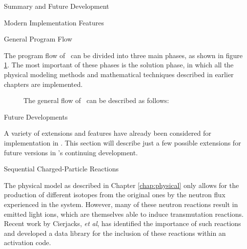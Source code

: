 \begin{chapter}{Summary and Future Development}
\begin{section}{Modern Implementation Features\label{sec:summary.modern}}
    \begin{subsection}{General Program Flow}
      
      The program flow of \ALARA\ can be divided into three main
      phases, as shown in figure \ref{fig:summary.prog_flow}.  The
      most important of these phases is the solution phase, in which
      all the physical modeling methods and mathematical techniques
      described in earlier chapters are implemented.
      
      \begin{figure}[htbp]
        \begin{center}
        \end{center}
        \caption{The general flow of \ALARA\  can be described as follows:}
        \label{fig:summary.prog_flow}
      \end{figure}
    
    \end{subsection}
    
  \end{section}
  
  \begin{section}{Future Developments}
  
    A variety of extensions and features have already been considered
    for implementation in \ALARA.  This section will describe just a
    few possible extensions for future versions in \ALARA's continuing
    development.

    \begin{subsection}{Sequential Charged-Particle Reactions}\label{ssec:future.data.seq}
    
      The physical model as described in Chapter \ref{chap:physical}
      only allows for the production of different isotopes from the
      original ones by the neutron flux experienced in the system.
      However, many of these neutron reactions result in emitted light
      ions, which are themselves able to induce transmutation
      reactions.  Recent work by Cierjacks, \textsl{et
        al}\cite{sequential}, has identified the importance of such
      reactions and developed a data library for the inclusion of
      these reactions within an activation code.
    

\end{subsection}
\end{section}
\end{chapter}
